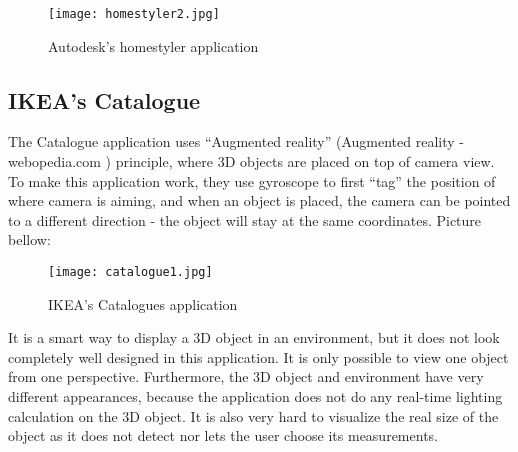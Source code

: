 \begin{figure}[H]
\centering
\texttt{[image: homestyler2.jpg]}
\caption{Autodesk's homestyler application}
\end{figure}

\subsection{IKEA’s Catalogue}

The Catalogue application uses “Augmented reality” (Augmented reality - webopedia.com ) principle, where 3D objects are placed on top of camera view. To make this application work, they use gyroscope to first “tag” the position of where camera is aiming, and when an object is placed, the camera can be pointed to a different direction - the object will stay at the same coordinates. Picture bellow:

\begin{figure}[H]
\centering
\texttt{[image: catalogue1.jpg]}
\caption{IKEA's Catalogues application}
\end{figure}

It is a smart way to display a 3D object in an environment, but it does not look completely well designed in this application. It is only possible to view one object from one perspective. Furthermore, the 3D object and environment have very different appearances, because the application does not do any real-time lighting calculation on the 3D object. It is also very hard to visualize the real size of the object as it does not detect nor lets the user choose its measurements.